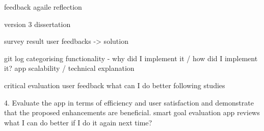 feedback agaile reflection


version 3 dissertation

survey result
user feedbacks -> solution


git log categorising
functionality - why did I implement it / how did I implement it?
app scalability / technical explanation



critical evaluation
user feedback
what can I do better
following studies

4. Evaluate the app in terms of efficiency and user satisfaction and demonstrate that the proposed enhancements are beneficial.
	smart goal evaluation
	app reviews
	what I can do better if I do it again next time?